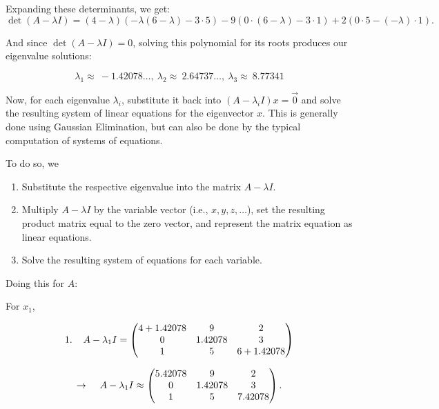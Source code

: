 \documentclass{article}
\begin{document}
Expanding these determinants, we get:
\[
\det(A - \lambda I) = (4 - \lambda)(-\lambda (6 - \lambda) - 3 \cdot 5) - 9(0 \cdot (6 - \lambda) - 3 \cdot 1) + 2(0 \cdot 5 - (-\lambda) \cdot 1).
\]

And since $\det(A - \lambda I) = 0$, solving this polynomial for its roots produces our eigenvalue solutions:

\[
\lambda_1 \approx \:-1.42078\dots ,\:\lambda_2\approx \:2.64737\dots ,\:\lambda_3\approx \:8.77341
\]

Now, for each eigenvalue \( \lambda_i \), substitute it back into \( (A - \lambda_i I) x = \vec{0} \) and solve the resulting system of linear equations for the eigenvector \( x \). This is generally done using Gaussian Elimination, but can also be done by the typical computation of systems of equations.

\vspace{1mm}
To do so, we 
\begin{enumerate}
    \item Substitute the respective eigenvalue into the matrix \( A - \lambda I \).
    \item Multiply \( A - \lambda I \) by the variable vector (i.e., \( x, y, z, \dots \)), set the resulting product matrix equal to the zero vector, and represent the matrix equation as linear equations.
    \item Solve the resulting system of equations for each variable.
\end{enumerate}

\vspace{2mm}

Doing this for $A$:

\vspace{4mm}

For $x_1$,

\[
1. \hspace{4mm} A - \lambda_1 I = \begin{pmatrix} 4 + 1.42078 & 9 & 2 \\ 0 & 1.42078 & 3 \\ 1 & 5 & 6 + 1.42078 \end{pmatrix}
\]

\[
\rightarrow \hspace{4mm} A - \lambda_1 I \approx \begin{pmatrix} 5.42078 & 9 & 2 \\ 0 & 1.42078 & 3 \\ 1 & 5 & 7.42078 \end{pmatrix}.
\]
\end{document}
